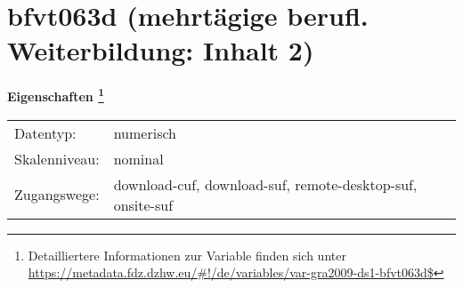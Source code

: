 
    \setcounter{footnote}{0}

    \vspace*{-1.8cm}
	\section{bfvt063d (mehrtägige berufl. Weiterbildung: Inhalt 2)}
	\label{section:bfvt063d}



    \vspace*{0.5cm}
    \noindent\textbf{Eigenschaften
	\footnote{Detailliertere Informationen zur Variable finden sich unter
		\url{https://metadata.fdz.dzhw.eu/\#!/de/variables/var-gra2009-ds1-bfvt063d$}}}\\
	\begin{tabularx}{\hsize}{@{}lX}
	Datentyp: & numerisch \\
	Skalenniveau: & nominal \\
	Zugangswege: &
	  download-cuf, 
	  download-suf, 
	  remote-desktop-suf, 
	  onsite-suf
 \\
    \end{tabularx}



